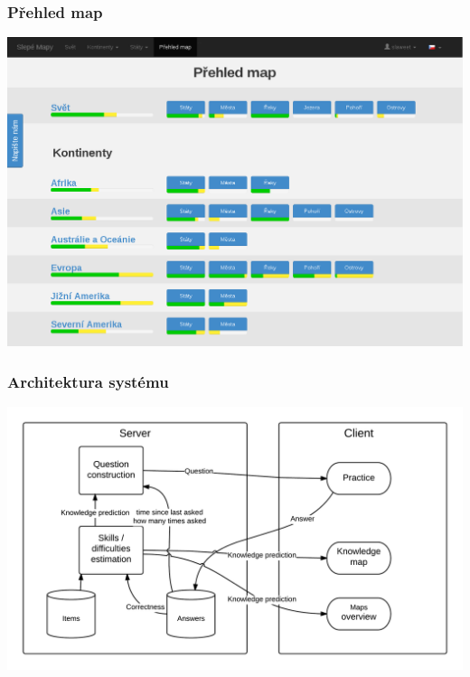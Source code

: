 \documentclass[xcolor=svgnames]{beamer}
\begin{document}
\begin{frame}
	\frametitle{Přehled map}
   \includegraphics[width=\textwidth]{img/overview.png}
\end{frame}
\begin{frame}
	\frametitle{Architektura systému}
   \includegraphics[width=\textwidth]{img/architecture.png}
\end{frame}
\end{document}
